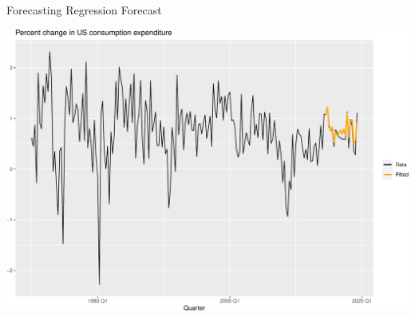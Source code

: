 \documentclass[
  ignorenonframetext,
]{beamer}
\begin{document}
\begin{frame}{Forecasting \textbar{} \small Regression Forecast}
\protect\hypertarget{forecasting-regression-forecast-1}{}
\tiny

\includegraphics{Time-series-regression-models_files/figure-beamer/unnamed-chunk-22-1.pdf}

\normalfont
\end{frame}
\end{document}

